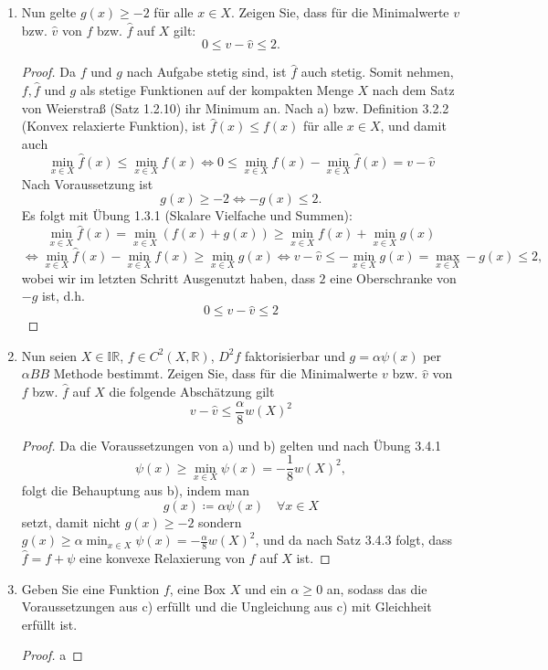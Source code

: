 \documentclass[12pt]{extreport} %
\newcommand{\R}{\mathbb{R}}
\begin{document}
\begin{enumerate}
\begin{proof}
			$$ D^2 \hat{f} = \begin{pmatrix}
				2 & 0 \\ 0 & 2
			\end{pmatrix} \succ 0 $$
			wodurch $\hat{f}$ nach Satz 2.5.3 ($C^2$-Charakterisierung von Konvexität) konvex ist. %
		\end{proof}
	\item Nun gelte $g(x) \geq -2$ für alle $x \in X$. Zeigen Sie, dass für die Minimalwerte $v$ bzw. $\hat{v}$ von $f$ bzw. $\hat{f}$ auf $X$ gilt:
		$$ 0 \leq v - \hat{v} \leq 2. $$
		\begin{proof}
			Da $f$ und $g$ nach Aufgabe stetig sind, ist $\hat{f}$ auch stetig. Somit nehmen, $f, \hat{f}$ und $g$ als stetige Funktionen auf der kompakten Menge $X$ nach dem Satz von Weierstraß (Satz 1.2.10) ihr Minimum an. Nach a) bzw. Definition 3.2.2 (Konvex relaxierte Funktion), ist $\hat{f}(x) \leq f(x)$ für alle $x \in X$, und damit auch 
			$$ \min_{x \in X} \hat{f}(x) \leq \min_{x \in X} f(x) \iff 0 \leq \min_{x \in X} f(x) - \min_{x \in X} \hat{f}(x) = v - \hat{v}  $$
			Nach Voraussetzung ist 
			$$ g(x) \geq -2 \iff -g(x) \leq 2. $$
			 Es folgt mit Übung 1.3.1 (Skalare Vielfache und Summen):
			$$ \min_{x \in X} \hat{f}(x) = \min_{x \in X} \left( f(x) + g(x) \right) \geq \min_{x \in X} f(x) + \min_{x \in X} g(x)$$
			$$ \iff \min_{x \in X} \hat{f}(x) - \min_{x \in X} f(x) \geq \min_{x \in X} g(x) \iff v - \hat{v} \leq  - \min_{x \in X} g(x) = \max_{x \in X} - g(x) \leq 2, $$
			wobei wir im letzten Schritt Ausgenutzt haben, dass $2$ eine Oberschranke von $-g$ ist, d.h. 
			$$ 0 \leq v - \hat{v} \leq 2 $$
		\end{proof}
	\item Nun seien $X \in \mathbb{IR}$, $f \in C^2(X, \R)$, $D^2 f$ faktorisierbar und $g = \alpha \psi(x)$ per $\alpha BB$ Methode bestimmt. Zeigen Sie, dass für die Minimalwerte $v$ bzw. $\hat{v}$ von $f$ bzw. $\hat{f}$ auf $X$ die folgende Abschätzung gilt
		$$ v - \hat{v} \leq \frac{\alpha}{8} w(X)^2 $$
		\begin{proof}
			Da die Voraussetzungen von a) und b) gelten und nach Übung 3.4.1 
			$$ \psi(x) \geq \min_{x \in X} \psi(x) = -\frac{1}{8} w(X)^2, $$
			folgt die Behauptung aus b), indem man 
			$$ g(x) \coloneqq \alpha \psi(x) \quad \forall x \in X $$
			setzt, damit nicht $g(x) \geq -2$ sondern $g(x) \geq \alpha \min_{x \in X} \psi(x) = - \frac{\alpha}{8} w(X)^2$, und da nach Satz 3.4.3 folgt, dass $\hat{f} = f + \psi$ eine konvexe Relaxierung von $f$ auf $X$ ist.
		\end{proof}
	\item Geben Sie eine Funktion $f$, eine Box $X$ und ein $\alpha \geq 0$ an, sodass das die Voraussetzungen aus c) erfüllt und die Ungleichung aus c) mit Gleichheit erfüllt ist.
		\begin{proof}
			a
		\end{proof}
\end{enumerate}
\end{document}
